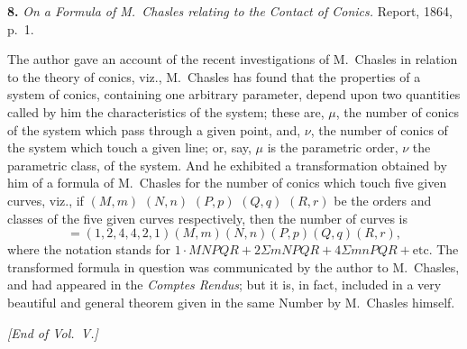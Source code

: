 \documentclass[11pt]{article}
\begin{document}
\medskip

\noindent\textbf{8.} \emph{On a Formula of M.~Chasles relating to the Contact of Conics.} Report, 1864, p.~1.

\medskip

The author gave an account of the recent investigations of M.~Chasles in relation to the theory of conics, viz., M.~Chasles has found that the properties of a system of conics, containing one arbitrary parameter, depend upon two quantities called by him the characteristics of the system; these are, $\mu$, the number of conics of the system which pass through a given point, and, $\nu$, the number of conics of the system which touch a given line; or, say, $\mu$ is the parametric order, $\nu$ the parametric class, of the system. And he exhibited a transformation obtained by him of a formula of M.~Chasles for the number of conics which touch five given curves, viz., if $(M, m)$ $(N, n)$ $(P, p)$ $(Q, q)$ $(R, r)$ be the orders and classes of the five given curves respectively, then the number of curves is
\[ = (1, 2, 4, 4, 2, 1)(M, m)(N, n)(P, p)(Q, q)(R, r), \]
where the notation stands for $1\cdot MNPQR + 2\Sigma mNPQR + 4\Sigma mnPQR + \text{etc.}$ The transformed formula in question was communicated by the author to M.~Chasles, and had appeared in the \emph{Comptes Rendus}; but it is, in fact, included in a very beautiful and general theorem given in the same Number by M.~Chasles himself.

\bigskip
\begin{center}\textit{[End of Vol.~V.]}\end{center}
\end{document}
